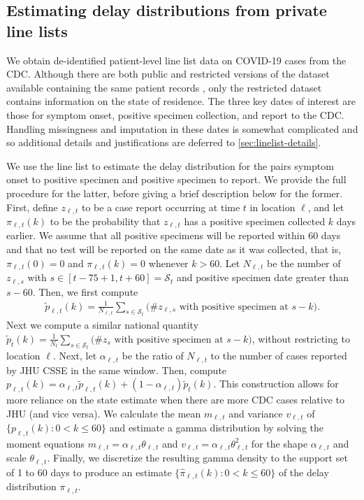 \subsection{Estimating delay distributions from private line lists}
\label{sec:delaystop}

We obtain de-identified patient-level line list data on COVID-19 cases from the
CDC. Although there are both public and restricted versions of the dataset
available containing the same patient records \citep{cdc2020casepub,
cdc2020caserestr}, only the restricted dataset contains information on the state
of residence. The three key dates of interest are those for symptom onset,
positive specimen collection, and report to the CDC. Handling missingness and
imputation in these dates is somewhat complicated and so additional details and
justifications are deferred to \autoref{sec:linelist-details}.

We use the line list to estimate the delay distribution for the pairs symptom
onset to positive specimen and positive specimen to report. We provide the full
procedure for the latter, before giving a brief description below for the
former. First, define $z_{\ell,t}$ to be a case report occurring at time $t$ in
location $\ell$, and let $\pi_{\ell,t}(k)$ to be the probability that
$z_{\ell,t}$ has a positive specimen collected $k$ days earlier. We assume that
all positive specimens will be reported within 60 days and that no test will be
reported on the same date as it was collected, that is, $\pi_{\ell,t}(0) = 0$
and $\pi_{\ell,t}(k) = 0$ whenever $k > 60$. Let $N_{\ell,t}$ be the number of
$z_{\ell,s}$ with $s\in[t-75+1,t+60] = \mathcal{S}_t$ and positive specimen date
greater than $s-60$. Then, we first compute
\begin{align}
    \tilde{p}_{\ell,t}(k) = \frac{1}{N_{\ell,t}}\sum_{s \in \mathcal{S}_t}
    \big(\textrm{\# $z_{\ell,s}$ with positive specimen at $s-k$}\big).
\end{align}
Next we compute a similar national quantity $\tilde{p}_{t}(k) =
\frac{1}{N_{t}}\sum_{s \in \mathcal{S}_t} \big(\textrm{\# $z_{s}$ with positive
specimen at $s-k$}\big)$, without restricting to location $\ell$. Next, let
$\alpha_{\ell,t}$ be the ratio of $N_{\ell,t}$ to the number of cases reported
by JHU CSSE\cite{dong2020interactive} in the same window. Then, compute
$p_{\ell,t}(k) = \alpha_{\ell,t}\tilde{p}_{\ell,t}(k) +
(1-\alpha_{\ell,t})\tilde{p}_t(k)$. This construction allows for more reliance
on the state estimate when there are more CDC cases relative to JHU (and vice
versa). We calculate the mean $m_{\ell,t}$ and variance $v_{\ell,t}$ of
$\{p_{\ell,t}(k) : 0<k\leq 60\}$ and estimate a gamma distribution by solving
the moment equations $m_{\ell,t} = \alpha_{\ell,t}\theta_{\ell,t}$ and
$v_{\ell,t}= \alpha_{\ell,t}\theta_{\ell,t}^2$ for the shape $\alpha_{\ell,t}$
and scale $\theta_{\ell,t}$. Finally, we discretize the resulting gamma density
to the support set of 1 to 60 days to produce an estimate
$\{\widehat{\pi}_{\ell,t}(k): 0 < k \leq 60\}$ of the delay distribution
$\pi_{\ell,t}$.
 
